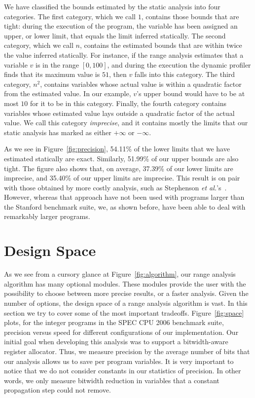 \documentclass{paper}
\begin{document}
We have classified the bounds estimated by the static analysis into four
categories.
The first category, which we call $1$, contains those bounds that are tight:
during the execution of the program, the variable has been assigned an upper,
or lower limit, that equals the limit inferred statically.
The second category, which we call $n$, contains the estimated bounds that are
within twice the value inferred statically.
For instance, if the range analysis estimates that a variable $v$ is in the
range $[0, 100]$, and during the execution the dynamic profiler finds that
its maximum value is $51$, then $v$ falls into this category.
The third category, $n^2$, contains variables whose actual value is within
a quadratic factor from the estimated value.
In our example, $v$'s upper bound would have to be at most $10$ for it to
be in this category.
Finally, the fourth category contains variables whose estimated value lays
outside a quadratic factor of the actual value.
We call this category {\em imprecise}, and it contains mostly the limits that
our static analysis has marked as either $+\infty$ or $-\infty$.

As we see in Figure~\ref{fig:precision}, 54.11\% of the lower limits that
we have estimated statically are exact.
Similarly, 51.99\% of our upper bounds are also tight.
The figure also shows that, on average, 37.39\% of our lower limits are
imprecise, and 35.40\% of our upper limits are imprecise.
This result is on pair with those obtained by more costly analysis, such as
Stephenson {\em et al.}'s~\cite{Stephenson00}.
However, whereas that approach have not been used with programs larger than
the Stanford benchmark suite, we, as shown before, have been able to
deal with remarkably larger programs.

\section{Design Space}
\label{sec:design}

As we see from a cursory glance at Figure~\ref{fig:algorithm}, our range
analysis algorithm has many optional modules.
These modules provide the user with the possibility to choose between
more precise results, or a faster analysis.
Given the number of options, the design space of a range analysis algorithm
is vast.
In this section we try to cover some of the most important tradeoffs.
Figure~\ref{fig:space} plots, for the integer programs in the SPEC CPU 2006
benchmark suite, precision versus speed for different configurations of
our implementation.
Our initial goal when developing this analysis was to support a bitwidth-aware
register allocator.
Thus, we measure precision by the average number of bits that our
analysis allows us to save per program variables.
It is very important to notice that we do not consider constants in our statistics of precision.
In other words, we only measure bitwidth reduction in variables that a constant
propagation step could not remove.
\end{document}
